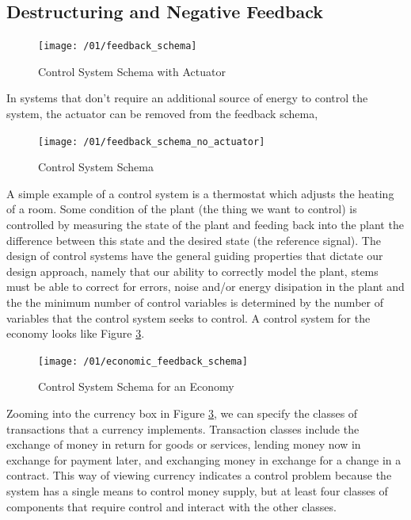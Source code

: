 \subsection{Destructuring and Negative Feedback}

\begin{figure}[H]
\texttt{[image: /01/feedback\_schema]}
\caption{Control System Schema with Actuator}
\label{fig:feedback_schema}
\end{figure}

In systems that don't require an additional source of energy to control the system, the actuator can
be removed from the feedback schema,

\begin{figure}[H]
\texttt{[image: /01/feedback\_schema\_no\_actuator]}
\caption{Control System Schema}
\label{fig:feedback_schema_no_actuator}
\end{figure}

A simple example of a control system is a thermostat which adjusts the heating of a room. Some
condition of the plant (the thing we want to control) is controlled by measuring the state of the
plant and feeding back into the plant the difference between this state and the desired state (the
reference signal). The design of control systems have the general guiding properties that dictate
our design approach, namely that our ability to correctly model the plant, stems must be able to
correct for errors, noise and/or energy disipation in the plant and the the minimum number of
control variables is determined by the number of variables that the control system seeks to control.
A control system for the economy looks like Figure \ref{fig:economic_feedback_schema}.

\begin{figure}[H]
\centering
\texttt{[image: /01/economic\_feedback\_schema]}
\caption{Control System Schema for an Economy}
\label{fig:economic_feedback_schema}
\end{figure}

Zooming into the currency box in Figure \ref{fig:economic_feedback_schema}, we can specify the
classes of transactions that a currency implements. Transaction classes include the exchange of
money in return for goods or services, lending money now in exchange for payment later, and
exchanging money in exchange for a change in a contract. This way of viewing currency indicates a
control problem because the system has a single means to control money supply, but at least four
classes of components that require control and interact with the other classes.

